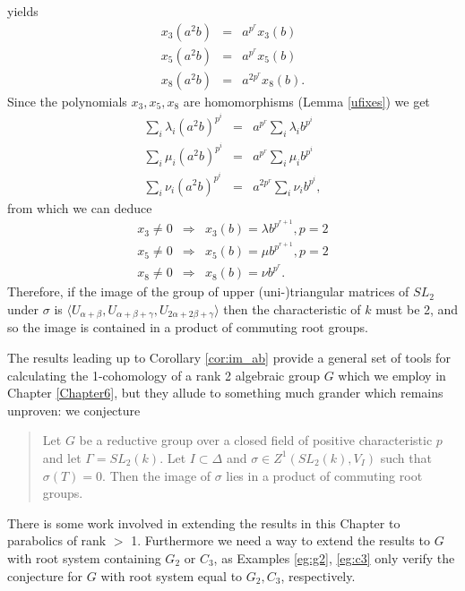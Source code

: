 \begin{example}
\begin{displaymath}
	\end{displaymath}
	yields
	\begin{eqnarray*}
		x_3(a^2b) &=& a^{p^r}x_3(b)\\
		x_5(a^2b) &=& a^{p^r}x_5(b)\\
		x_8(a^2b) &=& a^{2p^r}x_8(b).
	\end{eqnarray*}
	Since the polynomials $x_3, x_5, x_8$ are homomorphisms (Lemma \ref{ufixes}) we get
	\begin{eqnarray*}
		\sum_i \lambda_i (a^2b)^{p^i} &=& a^{p^r} \sum_i \lambda_i b^{p^i}\\
		\sum_i \mu_i (a^2b)^{p^i} &=& a^{p^r} \sum_i \mu_i b^{p^i}\\
		\sum_i \nu_i (a^2b)^{p^i} &=& a^{2p^r} \sum_i \nu_i b^{p^i},
	\end{eqnarray*}
	from which we can deduce
	\begin{eqnarray*}
		x_3 \neq 0 &\Longrightarrow& x_3(b) = \lambda b^{p^{r+1}}, p = 2\\
		x_5 \neq 0 &\Longrightarrow& x_5(b) = \mu b^{p^{r+1}}, p = 2\\
		x_8 \neq 0 &\Longrightarrow& x_8(b) = \nu b^{p^r}.
	\end{eqnarray*}
	Therefore, if the image of the group of upper (uni-)triangular matrices of $SL_2$ under $\sigma$ is $\langle U_{\alpha+\beta}, U_{\alpha+\beta+\gamma}, U_{2\alpha+2\beta+\gamma} \rangle$ then the characteristic of $k$ must be 2, and so the image is contained in a product of commuting root groups.
	\label{eg:c3}
\end{example}

The results leading up to Corollary \ref{cor:im_ab} provide a general set of tools for calculating the 1-cohomology of a rank 2 algebraic group $G$ which we employ in Chapter \ref{Chapter6}, but they allude to something much grander which remains unproven: we conjecture
\begin{quote}
	Let $G$ be a reductive group over a closed field of positive characteristic $p$ and let $\Gamma = SL_2(k)$. Let $I \subset \Delta$ and $\sigma \in Z^1(SL_2(k), V_I)$ such that $\sigma(T)  = 0$. Then the image of $\sigma$ lies in a product of commuting root groups.
	\label{conj:im_ab}
\end{quote}

There is some work involved in extending the results in this Chapter to parabolics of rank $>$ 1. Furthermore we need a way to extend the results to $G$ with root system containing $G_2$ or $C_3$, as Examples \ref{eg:g2}, \ref{eg:c3} only verify the conjecture for $G$ with root system equal to $G_2, C_3$, respectively.

